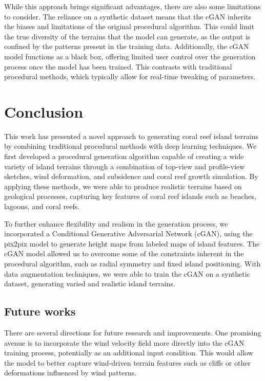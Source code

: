 While this approach brings significant advantages, there are also some limitations to consider. The reliance on a synthetic dataset means that the cGAN inherits the biases and limitations of the original procedural algorithm. This could limit the true diversity of the terrains that the model can generate, as the output is confined by the patterns present in the training data. Additionally, the cGAN model functions as a black box, offering limited user control over the generation process once the model has been trained. This contrasts with traditional procedural methods, which typically allow for real-time tweaking of parameters.


\section{Conclusion}

This work has presented a novel approach to generating coral reef island terrains by combining traditional procedural methods with deep learning techniques. We first developed a procedural generation algorithm capable of creating a wide variety of island terrains through a combination of top-view and profile-view sketches, wind deformation, and subsidence and coral reef growth simulation. By applying these methods, we were able to produce realistic terrains based on geological processes, capturing key features of coral reef islands such as beaches, lagoons, and coral reefs.

To further enhance flexibility and realism in the generation process, we incorporated a Conditional Generative Adversarial Network (cGAN), using the pix2pix model to generate height maps from labeled maps of island features. The cGAN model allowed us to overcome some of the constraints inherent in the procedural algorithm, such as radial symmetry and fixed island positioning. With data augmentation techniques, we were able to train the cGAN on a synthetic dataset, generating varied and realistic island terrains.


\subsection{Future works}

There are several directions for future research and improvements. One promising avenue is to incorporate the wind velocity field more directly into the cGAN training process, potentially as an additional input condition. This would allow the model to better capture wind-driven terrain features such as cliffs or other deformations influenced by wind patterns.

